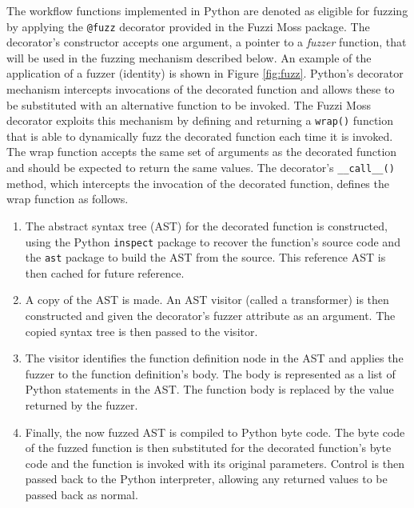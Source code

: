 \documentclass{sig-alternate}
\begin{document}
The workflow functions implemented in Python are denoted as eligible for fuzzing
by applying the \lstinline!@fuzz! decorator provided in the Fuzzi Moss
package. The decorator's constructor accepts one argument, a pointer to a
\emph{fuzzer} function, that will be used in the fuzzing mechanism described
below.  An example of the application of a fuzzer (identity) is shown in Figure
\ref{fig:fuzz}. Python's decorator mechanism intercepts invocations of the
decorated function and allows these to be substituted with an alternative
function to be invoked.  The Fuzzi Moss decorator exploits this mechanism by
defining and returning a \lstinline!wrap()!  function that is able to
dynamically fuzz the decorated function each time it is invoked.  The wrap
function accepts the same set of arguments as the decorated function and should
be expected to return the same values. The decorator's \lstinline!__call__()!
method, which intercepts the invocation of the decorated function, defines the
wrap function as follows.

\begin{enumerate}

\item The abstract syntax tree (AST) for the decorated function is constructed,
  using the Python \lstinline!inspect! package to recover the function's source
  code and the \lstinline!ast!  package to build the AST from the source.  This
  reference AST is then cached for future reference.

\item A copy of the AST is made.  An AST visitor (called a transformer) is then
  constructed and given the decorator's fuzzer attribute as an argument.  The
  copied syntax tree is then passed to the visitor.

\item The visitor identifies the function definition node in the AST and applies
  the fuzzer to the function definition's body.  The body is represented as a
  list of Python statements in the AST.  The function body is replaced by the
  value returned by the fuzzer.

\item Finally, the now fuzzed AST is compiled to Python byte code.  The byte
  code of the fuzzed function is then substituted for the decorated function's
  byte code and the function is invoked with its original parameters.  Control
  is then passed back to the Python interpreter, allowing any returned values to
  be passed back as normal.

\end{enumerate}
\end{document}

